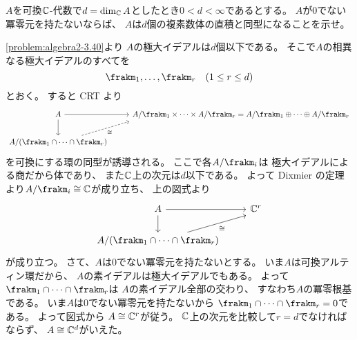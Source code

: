 \documentclass[report]{jlreq}
\begin{document}
\begin{problem}[代数学II 3.41]
    $A$を可換$\mathbb{C}$-代数で$d = \dim_{\mathbb{C}} A$としたとき$0 < d < \infty$であるとする。
    $A$が$0$でない冪零元を持たないならば、
    $A$は$d$個の複素数体の直積と同型になることを示せ。
\end{problem}

\begin{answer}
    \cref{problem:algebra2-3.40}より
    $A$の極大イデアルは$d$個以下である。
    そこで$A$の相異なる極大イデアルのすべてを
    \begin{equation}
        \frakm_1, \dots, \frakm_{r}
        \quad (1 \le r \le d)
    \end{equation}
    とおく。
    すると CRT より
    \begin{equation}
        \begin{tikzcd}
            A \ar{d} \ar{r}
                & A / \frakm_1 \times \cdots \times A / \frakm_r
                = A / \frakm_1 \oplus \cdots \oplus A / \frakm_r \\
            A / (\frakm_1 \cap \cdots \cap \frakm_r)
                \ar[dashed, end anchor=south west]{ru}[swap]{\cong}
        \end{tikzcd}
    \end{equation}
    を可換にする環の同型が誘導される。
    ここで各$A / \frakm_i$は
    極大イデアルによる商だから体であり、
    また$\mathbb{C}$上の次元は$d$以下である。
    よって Dixmier の定理より$A / \frakm_i \cong \C$が成り立ち、
    上の図式より
    \begin{equation}
        \begin{tikzcd}
            A \ar{d} \ar{r}
                & \C^r \\
            A / (\frakm_1 \cap \cdots \cap \frakm_r)
                \ar[end anchor=south west]{ru}[swap]{\cong}
        \end{tikzcd}
    \end{equation}
    が成り立つ。
    さて、$A$は$0$でない冪零元を持たないとする。
    いま$A$は可換アルティン環だから、
    $A$の素イデアルは極大イデアルでもある。
    よって$\frakm_1 \cap \cdots \cap \frakm_r$は
    $A$の素イデアル全部の交わり、
    すなわち$A$の冪零根基である。
    いま$A$は$0$でない冪零元を持たないから
    $\frakm_1 \cap \cdots \cap \frakm_r = 0$である。
    よって図式から
    $A \cong \mathbb{C}^r$が従う。
    $\mathbb{C}$上の次元を比較して$r = d$でなければならず、
    $A \cong \mathbb{C}^d$がいえた。
\end{answer}
\end{document}
